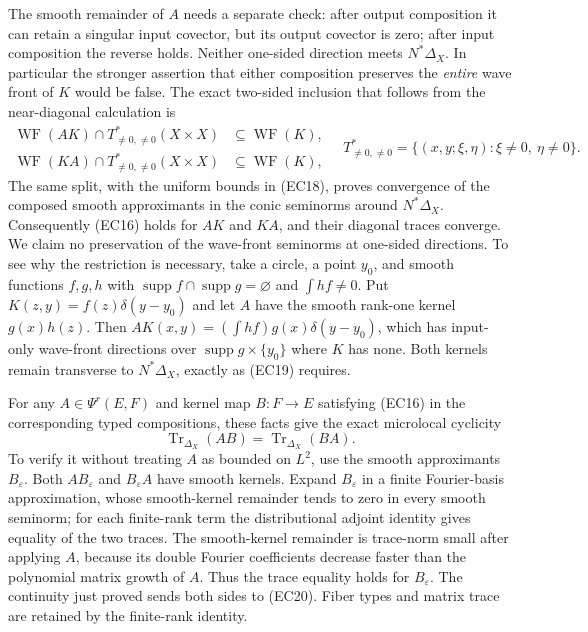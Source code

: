 \documentclass[
  11pt,
]{article}
\begin{document}
The smooth remainder of \(A\) needs a separate check: after output
composition it can retain a singular input covector, but its output
covector is zero; after input composition the reverse holds. Neither
one-sided direction meets \(N^*\Delta_X\). In particular the stronger
assertion that either composition preserves the \emph{entire} wave front
of \(K\) would be false. The exact two-sided inclusion that follows from
the near-diagonal calculation is \[
 \begin{aligned}
 \operatorname{WF}(AK)\cap T^*_{\ne0,\ne0}(X\times X)
   &\subseteq \operatorname{WF}(K),\\
 \operatorname{WF}(KA)\cap T^*_{\ne0,\ne0}(X\times X)
   &\subseteq \operatorname{WF}(K),
 \end{aligned}
 \quad
 T^*_{\ne0,\ne0}
  =\{(x,y;\xi,\eta):\xi\ne0,\ \eta\ne0\}.
 \tag{EC19}
\] The same split, with the uniform bounds in (EC18), proves convergence
of the composed smooth approximants in the conic seminorms around
\(N^*\Delta_X\). Consequently (EC16) holds for \(AK\) and \(KA\), and
their diagonal traces converge. We claim no preservation of the
wave-front seminorms at one-sided directions. To see why the restriction
is necessary, take a circle, a point \(y_0\), and smooth functions
\(f,g,h\) with
\(\operatorname{supp}f\cap\operatorname{supp}g=\varnothing\) and
\(\int hf\ne0\). Put \(K(z,y)=f(z)\delta(y-y_0)\) and let \(A\) have the
smooth rank-one kernel \(g(x)h(z)\). Then
\(AK(x,y)=(\int hf)g(x)\delta(y-y_0)\), which has input-only wave-front
directions over \(\operatorname{supp}g\times\{y_0\}\) where \(K\) has
none. Both kernels remain transverse to \(N^*\Delta_X\), exactly as
(EC19) requires.

For any \(A\in\Psi^r(E,F)\) and kernel map \(B:F\to E\) satisfying
(EC16) in the corresponding typed compositions, these facts give the
exact microlocal cyclicity \[
 \operatorname{Tr}_{\Delta_X}(AB)
       =\operatorname{Tr}_{\Delta_X}(BA).
 \tag{EC20}
\] To verify it without treating \(A\) as bounded on \(L^2\), use the
smooth approximants \(B_\varepsilon\). Both \(AB_\varepsilon\) and
\(B_\varepsilon A\) have smooth kernels. Expand \(B_\varepsilon\) in a
finite Fourier-basis approximation, whose smooth-kernel remainder tends
to zero in every smooth seminorm; for each finite-rank term the
distributional adjoint identity gives equality of the two traces. The
smooth-kernel remainder is trace-norm small after applying \(A\),
because its double Fourier coefficients decrease faster than the
polynomial matrix growth of \(A\). Thus the trace equality holds for
\(B_\varepsilon\). The continuity just proved sends both sides to
(EC20). Fiber types and matrix trace are retained by the finite-rank
identity.
\end{document}
